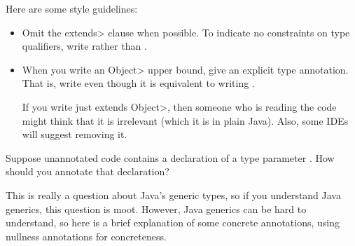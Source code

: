 Here are some style guidelines:
\begin{itemize}
\item
  Omit the \<extends> clause when possible.  To indicate no constraints on
  type qualifiers, write  rather than .
\item
  When you write an \<Object> upper bound, give an explicit type annotation.
  That is, write  even though it is equivalent to writing
  .

  If you write just \<extends Object>, then someone who is reading the code
  might think that it is irrelevant (which it is in plain Java).  Also,
  some IDEs will suggest removing it.
\end{itemize}



Suppose unannotated code contains a declaration of a type parameter
.  How should you annotate that declaration?

This is really a question about Java's generic types, so if you understand
Java generics, this question is moot.  However, Java generics can be hard
to understand, so here is a brief explanation of some concrete annotations,
using nullness annotations for concreteness.

